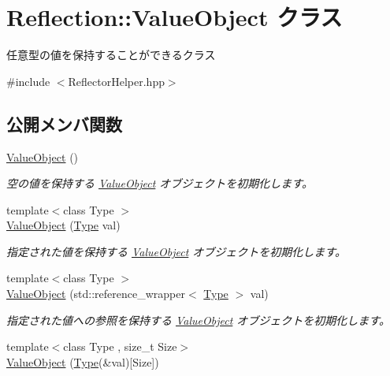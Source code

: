 \hypertarget{class_reflection_1_1_value_object}{}\section{Reflection\+:\+:Value\+Object クラス}
\label{class_reflection_1_1_value_object}


任意型の値を保持することができるクラス 




{\ttfamily \#include $<$Reflector\+Helper.\+hpp$>$}

\subsection*{公開メンバ関数}
\begin{DoxyCompactItemize}
\item 
\hyperlink{class_reflection_1_1_value_object_a1cdbf247fc231bcc6eafe2f3cd60fc04}{Value\+Object} ()
\begin{DoxyCompactList}\small\item\em 空の値を保持する \hyperlink{class_reflection_1_1_value_object}{Value\+Object} オブジェクトを初期化します。\end{DoxyCompactList}\item 
{\footnotesize template$<$class Type $>$ }\\\hyperlink{class_reflection_1_1_value_object_aa50228eb33aa5a5b5c0c220414d6ea40}{Value\+Object} (\hyperlink{class_reflection_1_1_type}{Type} val)
\begin{DoxyCompactList}\small\item\em 指定された値を保持する \hyperlink{class_reflection_1_1_value_object}{Value\+Object} オブジェクトを初期化します。\end{DoxyCompactList}\item 
{\footnotesize template$<$class Type $>$ }\\\hyperlink{class_reflection_1_1_value_object_ae7eb6f4d1fee6368b140472adf2586a1}{Value\+Object} (std\+::reference\+\_\+wrapper$<$ \hyperlink{class_reflection_1_1_type}{Type} $>$ val)
\begin{DoxyCompactList}\small\item\em 指定された値への参照を保持する \hyperlink{class_reflection_1_1_value_object}{Value\+Object} オブジェクトを初期化します。\end{DoxyCompactList}\item 
{\footnotesize template$<$class Type , size\+\_\+t Size$>$ }\\\hyperlink{class_reflection_1_1_value_object_a75dc850c81551b2f96d72ea9ee536f9d}{Value\+Object} (\hyperlink{class_reflection_1_1_type}{Type}(\&val)\mbox{[}Size\mbox{]})

\end{DoxyCompactItemize}
